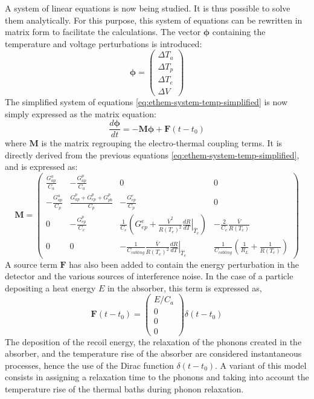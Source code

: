 A system of linear equations is now being studied. It is thus possible to solve them analytically. For this purpose, this system of equations can be rewritten in matrix form to facilitate the calculations. The vector $\bm{\phi}$ containing the temperature and voltage perturbations is introduced:
\begin{equation}
\label{eq:ethem-phi}
\bm{\phi} = 
\left( \begin{array}{c}
\Delta T_a\\
\Delta T_p\\
\Delta T_e\\
\Delta V
\end{array} \right)
\end{equation}
The simplified system of equations \ref{eq:ethem-system-temp-simplified} is now simply expressed as the matrix equation:
\begin{equation}
\label{eq:ethem-matrix-eq}
\frac{d \bm{\phi}}{d t}= - \bm{M} \bm{\phi} + \bm{F}(t-t_0)
\end{equation}
where $\bm{M}$ is the matrix regrouping the electro-thermal coupling terms. It is directly derived from the previous equations \ref{eq:ethem-system-temp-simplified}, and is expressed as:
\begin{equation}
\label{eq:ethem-coupling-mat}
\bm{M} = 
\left( \begin{array}{cccc}
 \frac{G_{ap}^a}{C_a}&-\frac{G_{ap}^p}{C_a}&0&0 \\
 -\frac{G_{ap}^a}{C_p}&\frac{G_{ap}^p+G_{ep}^p+G_{pb}^p}{C_p}&-\frac{G_{ep}^e}{C_p}&0 \\
0&-\frac{G_{ep}^p}{C_e}&\frac{1}{C_e}\left(G_{ep}^e + \frac{\bar{V}^2}{R(T_e)^2}  \left.\frac{d R}{d T}\right\vert_{\bar{T}_e} \right)&-\frac{2}{C_e}\frac{\bar{V}}{R(T_e)}\\
0&0&-\frac{1}{C_{cabling}}\frac{\bar{V}}{R(T_e)^2} \left.\frac{d R}{d T}\right\vert_{\bar{T}_e} &\frac{1}{C_{cabling}}\left( \frac{1}{R_L} + \frac{1}{R(T_e)} \right)
\end{array} \right)
\end{equation}
A source term $\bm{F}$ has also been added to contain the energy perturbation in the detector and the various sources of interference noise. In the case of a particle depositing a heat energy $E$ in the absorber, this term is expressed as,
\begin{equation}
\bm{F}(t-t_0) = 
\left( \begin{array}{c}
E/C_a \\
0 \\
0 \\
0
\end{array} \right) \delta (t-t_0)
\end{equation}
The deposition of the recoil energy, the relaxation of the phonons created in the absorber, and the temperature rise of the absorber are considered instantaneous processes, hence the use of the Dirac function $\delta (t-t_0)$. A variant of this model consists in assigning a relaxation time to the phonons and taking into account the temperature rise of the thermal baths during phonon relaxation.

